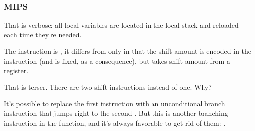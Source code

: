 \subsubsection{MIPS}





That is verbose: all local variables are located in the local stack and reloaded each time they're needed.

The \SLLV instruction is , it differs from \SLL only in that
the shift amount is encoded in the \SLL instruction (and is fixed, as a consequence), 
but \SLLV takes shift amount from a register.


That is terser.
There are two shift instructions instead of one.
Why?

It's possible to replace the first \SLLV instruction with an unconditional branch instruction that jumps right to the second \SLLV.
But this is another branching instruction in the function, and it's always favorable to get rid of them: .




